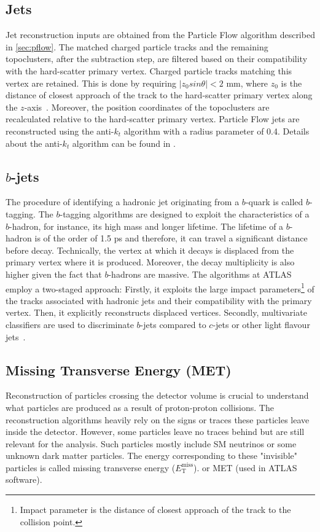 \subsection*{Jets}
Jet reconstruction inputs are obtained from the Particle Flow algorithm described in \cref{sec:pflow}. The
matched charged particle tracks and the remaining topoclusters, after the subtraction step, are 
filtered based on their compatibility with the hard-scatter primary vertex. Charged particle 
tracks matching this vertex are retained. This is done by requiring $|z_0 sin\theta|<2$ mm, 
where $z_0$ is the distance of closest approach of the track to the hard-scatter primary vertex 
along the $z$-axis~\cite{Aaboud:2257597}. Moreover, the position coordinates of the topoclusters are recalculated 
relative to the hard-scatter primary vertex. Particle Flow jets are reconstructed using the 
anti-$k_t$ algorithm with a radius parameter of 0.4. Details about the anti-$k_t$ algorithm 
can be found in \cite{Cacciari:2008gp}.

\subsection*{$b$-jets}
The procedure of identifying a hadronic jet originating from a $b$-quark is called $b$-tagging.
The $b$-tagging algorithms are designed to exploit the characteristics of a $b$-hadron, for instance,
its high mass and longer lifetime. The lifetime of a $b$-hadron is of the order of 1.5 ps and 
therefore, it can travel a significant distance before decay. Technically, the vertex at which 
it decays is displaced from the primary vertex where it is produced. Moreover, the decay 
multiplicity is also higher given the fact that $b$-hadrons are massive. The algorithms at ATLAS
employ a two-staged approach: Firstly, it exploits the large impact 
parameters\footnote{Impact parameter is the distance of closest approach
of the track to the collision point.} of the tracks associated with hadronic jets
and their compatibility with the primary vertex. Then, it explicitly reconstructs displaced vertices.
Secondly, multivariate classifiers are used to discriminate $b$-jets compared to $c$-jets or other
light flavour jets~\cite{Aad:2682119}. 


\subsection{Missing Transverse Energy (MET)}
Reconstruction of particles crossing the detector volume is crucial to understand what particles
are produced as a result of proton-proton collisions. The reconstruction algorithms heavily rely on the
signs or traces these particles leave inside the detector. However, some particles leave no traces
behind but are still relevant for the analysis. Such particles mostly include SM neutrinos or some unknown dark matter
particles. The energy corresponding to these "invisible" particles is called missing transverse energy ($E_{\text{T}}^{\text{miss}}$).
or MET (used in ATLAS software).

